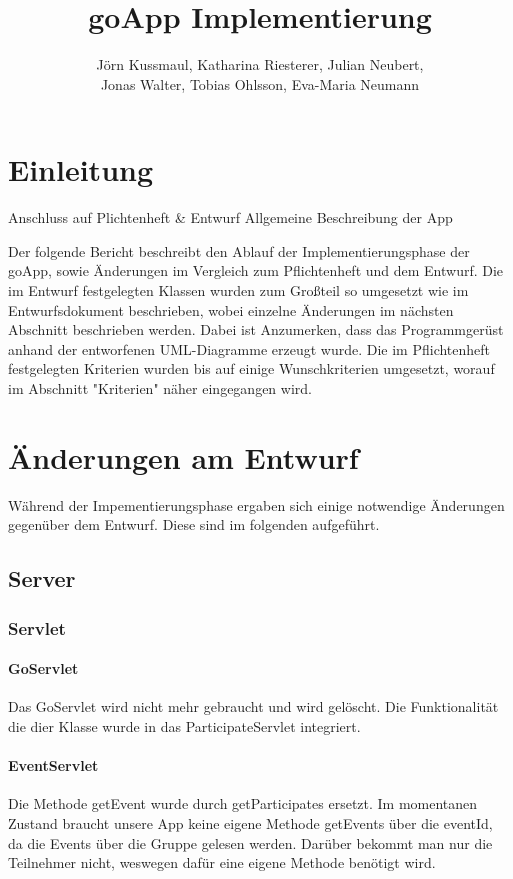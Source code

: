 \documentclass{scrartcl}
\title{goApp Implementierung}
\author{Jörn Kussmaul, Katharina Riesterer, Julian Neubert,\\ Jonas Walter, Tobias Ohlsson, Eva-Maria Neumann}
\begin{document}
	\maketitle
	\newpage
	\tableofcontents
	\newpage

	\section{Einleitung}%
	Anschluss auf Plichtenheft \& Entwurf
	Allgemeine Beschreibung der App
	
	Der folgende Bericht beschreibt den Ablauf der Implementierungsphase der goApp, sowie Änderungen im Vergleich zum Pflichtenheft und dem Entwurf. Die im Entwurf festgelegten Klassen wurden zum Großteil so umgesetzt wie im Entwurfsdokument beschrieben, wobei einzelne Änderungen im nächsten Abschnitt beschrieben werden. Dabei ist Anzumerken, dass das Programmgerüst anhand der entworfenen UML-Diagramme erzeugt wurde. Die im Pflichtenheft festgelegten Kriterien wurden bis auf einige Wunschkriterien umgesetzt, worauf im Abschnitt "Kriterien" näher eingegangen wird.
	\newpage
	\section{Änderungen am Entwurf}
	Während der Impementierungsphase ergaben sich einige notwendige Änderungen gegenüber dem Entwurf. Diese sind im folgenden aufgeführt.
	
	\subsection{Server}
	\subsubsection{Servlet}
	\paragraph{GoServlet}
	Das GoServlet wird nicht mehr gebraucht und wird gelöscht. Die Funktionalität die dier Klasse wurde in das ParticipateServlet integriert.
	
	
	\paragraph{EventServlet}
	Die Methode getEvent wurde durch getParticipates ersetzt. Im momentanen Zustand braucht unsere App keine eigene Methode getEvents über die eventId, da die Events über die Gruppe gelesen werden. 
	Darüber bekommt man nur die Teilnehmer nicht, weswegen dafür eine eigene Methode benötigt wird.
	
\end{document}

